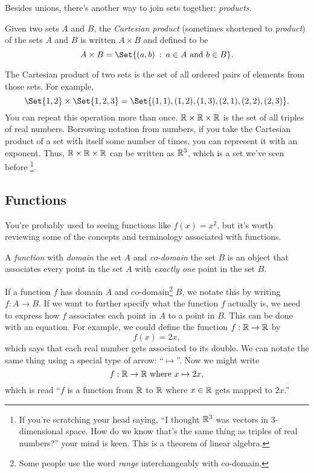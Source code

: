 	Besides unions, there's another way to join sets together:
	\emph{products}.
	\begin{definition}
		Given two sets $A$ and $B$, the \emph{Cartesian product} (sometimes
		shortened to \emph{product}) of the sets $A$ and $B$ is written
		$A\times B$ and defined to be
		\[
			A\times B = \Set{(a,b)\given a\in A\text{ and }b\in B}.
		\]
	\end{definition}
	The Cartesian product of two sets is the set of all ordered pairs of elements from
	those sets.  For example, 
	\[
		\Set{1,2}\times \Set{1,2,3}=\Set{(1,1),(1,2),(1,3),(2,1),(2,2),(2,3)}.
	\]
	You can repeat this operation more than once.   $\mathbb{R}\times \mathbb{R}\times \mathbb{R}$
	is the set of all triples of real numbers.  Borrowing
	notation from numbers, if you take the Cartesian product of a set
	with itself some number of times, you can represent it with
	an exponent.  Thus, $\mathbb{R}\times \mathbb{R}\times \mathbb{R}$ can be written as $\mathbb{R}^3$, which is a set we've
	seen before%
	\footnote{
		If you're scratching your head saying, ``I thought $\mathbb{R}^3$ was vectors in $3$-dimensional
		space.  How do we know that's the same thing as triples of real numbers?'' your mind
		is keen.  This is a theorem of linear algebra.
	}.

	\subsection{Functions}
	You're probably used to seeing functions like $f(x)=x^2$, but it's worth reviewing some of the concepts
	and terminology associated with functions.

	\begin{definition}[Function]
		A \emph{function} with \emph{domain} the 
		set $A$ and \emph{co-domain} the set $B$ is an object that
		associates every point in the set $A$ with \emph{exactly one} point in the set $B$.
	\end{definition}

	If a function $f$ has domain $A$ and co-domain\footnote{ Some
	people use the word \emph{range} interchangeably with co-domain.} $B$,
	we notate this by writing $f:A\to B$.
	If we want to further specify what the function $f$ actually is, we need to
	express how $f$ associates each point in $A$ to a point in $B$.  This can be done
	with an equation.  For example, we could define the function $f:\mathbb{R}\to\mathbb{R}$ by
	\[
		f(x)=2x,
	\]
	which says that each real number gets associated to its double.  We can notate
	the same thing using a special type of arrow: ``$\mapsto$''.  Now we might write
	\[
		f:\mathbb{R}\to\mathbb{R}\text{ where } x\mapsto 2x,
	\]
	which is read ``$f$ is a function from $\mathbb{R}$ to $\mathbb{R}$ where $x\in \mathbb{R}$ gets mapped to $2x$.''

